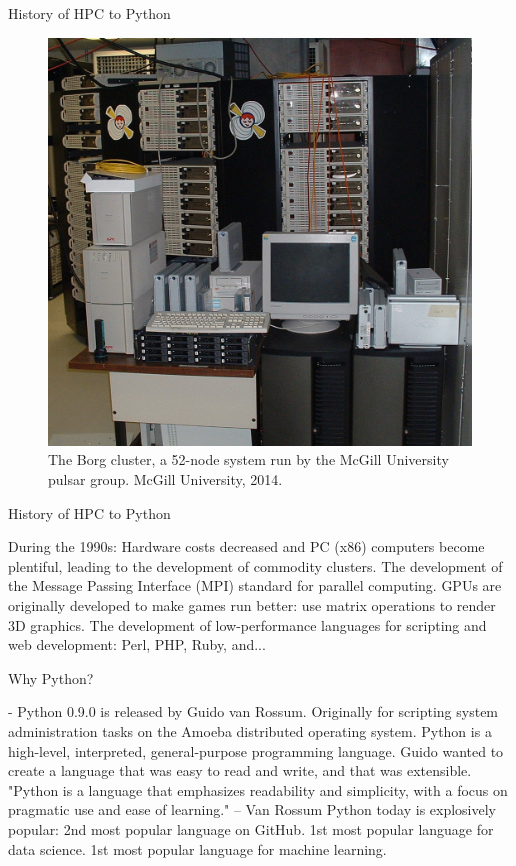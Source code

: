 \documentclass[aspectratio=169]{beamer}
\begin{document}
    \begin{frame}{History of HPC to Python}
        \begin{figure}[H]
            \centering
            \includegraphics[width=0.40\linewidth]{Borg.jpg}
            \caption{The Borg cluster, a 52-node system run by the McGill University pulsar group. \ccLogo McGill University, 2014.}
        \end{figure}
    \end{frame}

    \begin{frame}{History of HPC to Python}
        \begin{outline}
            \1 During the 1990s:
                \2 Hardware costs decreased and PC (x86) computers become plentiful, leading to the development of commodity clusters.
                \2 The development of the Message Passing Interface (MPI) standard for parallel computing.
                \2 GPUs are originally developed to make games run better: use matrix operations to render 3D graphics. 
                \2 The development of low-performance languages for scripting and web development: Perl, PHP, Ruby, and... 
        \end{outline}
    \end{frame}

    \begin{frame}{Why Python?}
        \begin{outline}
             - Python 0.9.0 is released by Guido van Rossum. 
                \2 Originally for scripting system administration tasks on the Amoeba distributed operating system.
                \2 Python is a high-level, interpreted, general-purpose programming language.
                \2 Guido wanted to create a language that was easy to read and write, and that was extensible.
                    \3 "Python is a language that emphasizes readability and simplicity, with a focus on pragmatic use and ease of learning." -- Van Rossum
            \1 Python today is explosively popular:
                \2 2nd most popular language on GitHub.
                \2 1st most popular language for data science.
                \2 1st most popular language for machine learning.
        \end{outline}
    \end{frame}
\end{document}
